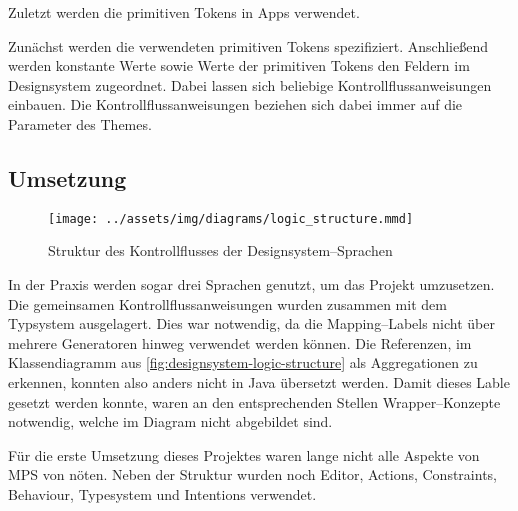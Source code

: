Zuletzt werden die primitiven Tokens in Apps verwendet.

Zunächst werden die verwendeten primitiven Tokens spezifiziert.
Anschließend werden konstante Werte sowie Werte der primitiven Tokens den Feldern im Designsystem zugeordnet.
Dabei lassen sich beliebige Kontrollflussanweisungen einbauen.
Die Kontrollflussanweisungen beziehen sich dabei immer auf die Parameter des Themes.

\subsection{Umsetzung}\label{subsec:umsetzung}
\begin{figure}
    \texttt{[image: ../assets/img/diagrams/logic\_structure.mmd]}
    \caption{Struktur des Kontrollflusses der Designsystem--Sprachen}
    \label{fig:designsystem-logic-structure}
\end{figure}
In der Praxis werden sogar drei Sprachen genutzt, um das Projekt umzusetzen.
Die gemeinsamen Kontrollflussanweisungen wurden zusammen mit dem Typsystem ausgelagert.
Dies war notwendig, da die Mapping--Labels nicht über mehrere Generatoren hinweg verwendet werden können.
Die Referenzen, im Klassendiagramm aus \autoref{fig:designsystem-logic-structure} als Aggregationen zu erkennen, konnten also anders nicht in Java übersetzt werden.
Damit dieses Lable gesetzt werden konnte, waren an den entsprechenden Stellen Wrapper--Konzepte notwendig, welche im Diagram nicht abgebildet sind.

Für die erste Umsetzung dieses Projektes waren lange nicht alle Aspekte von \ac{MPS} von nöten.
Neben der Struktur wurden noch Editor, Actions, Constraints, Behaviour, Typesystem und Intentions verwendet.

